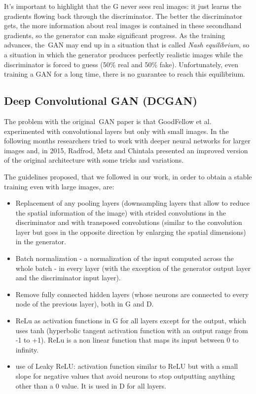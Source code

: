 It's important to highlight that the G never sees real images: it just learns the gradients flowing back through the discriminator. The better the discriminator gets, the more information about real images is contained in these secondhand gradients, so the generator can make significant progress\cite[p.~1301]{hands_on_ml}.
As the training advances, the~\ac{GAN} may end up in a situation that is called \textit{Nash equilibrium}, so a situation in which the generator produces perfectly realistic images while the discriminator is forced to guess (50\% real and 50\% fake). Unfortunately, even training a GAN for a long time, there is no guarantee to reach this equilibrium\cite[p.~1307]{hands_on_ml}. 

\subsection{Deep Convolutional GAN (DCGAN)}
\label{subsec:dcgan}
The problem with the original~\ac{GAN} paper \cite{gan} is that GoodFellow et al. experimented with convolutional layers but only with small images.
In the following months researchers tried to work with deeper neural networks for larger images and, in 2015, Radfrod, Metz and Chintala presented an improved version of the original architecture with some tricks and variations\cite{dcgan}.


The guidelines proposed, that we followed in our work, in order to obtain a stable training even with large images, are: 
\begin{itemize}
  \item Replacement of any pooling layers (downsampling layers that allow to reduce the spatial information of the image) with strided convolutions in the discriminator and with transposed convolutions (similar to the convolution layer but goes in the opposite direction by enlarging the spatial dimensions) in the generator.
  \item Batch normalization\cite{batchnormalization} - a normalization of the input computed across the whole batch - in every layer (with the exception of the generator output layer and the discriminator input layer).
  \item Remove fully connected hidden layers (whose neurons are connected to every node of the previous layer), both in G and D.
  \item ReLu as activation functions\cite{relu} in G for all layers except for the output, which uses tanh (hyperbolic tangent activation function with an output range from -1 to +1). ReLu is a non linear function that maps its input between 0 to infinity.
  \item use of Leaky ReLU: activation function similar to ReLU but with a small slope for negative values that avoid neurons to stop outputting anything other than a 0 value. It is used in D for all layers.
\end{itemize}

